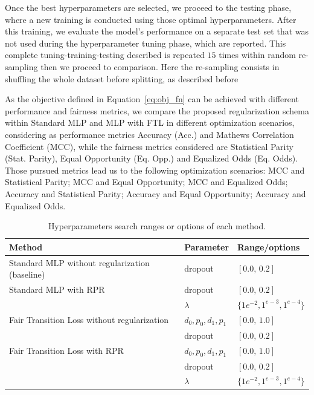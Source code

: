 Once the best hyperparameters are selected, we proceed to the testing phase, where a new training is conducted using those optimal hyperparameters. After this training, we evaluate the model's performance on a separate test set that was not used during the hyperparameter tuning phase, which are reported. This complete tuning-training-testing described is repeated $15$ times within random re-sampling then we proceed to comparison. Here the re-sampling consists in shuffling the whole dataset before splitting, as described before

As the objective defined in Equation~\ref{eq:obj_fn} can be achieved with different performance and fairness metrics, we compare the proposed regularization schema within Standard MLP and MLP with FTL in different optimization scenarios, considering as performance metrics Accuracy (Acc.) and Mathews Correlation Coefficient (MCC), while the fairness metrics considered are Statistical Parity (Stat. Parity), Equal Opportunity (Eq. Opp.) and Equalized Odds (Eq. Odds). Those pursued metrics lead us to the following optimization scenarios: MCC and Statistical Parity; MCC and Equal Opportunity; MCC and Equalized Odds; Accuracy and Statistical Parity; Accuracy and Equal Opportunity; Accuracy and Equalized Odds.

\begin{table}[ht]
\centering
\caption{Hyperparameters search ranges or options of each method.}\label{tab:hyperparameters_rpr}
{\footnotesize
\begin{tabular}{lll}
\toprule
Method & Parameter & Range/options \\ \midrule
 Standard MLP without regularization (baseline) & dropout & $[0.0,\,0.2]$  \vspace{1ex} \\
 Standard MLP with RPR & dropout & $[0.0,\,0.2]$  \vspace{1ex} \\
 & $\lambda$ & $\{1e^{-2}, 1^{e-3}, 1^{e-4}\}$ \\
 Fair Transition Loss without regularization & $d_0,p_0,d_1,p_1$ & $[0.0,\,1.0]$ \\
 &  dropout & $[0.0,\,0.2]$ \\
 Fair Transition Loss with RPR & $d_0,p_0,d_1,p_1$ & $[0.0,\,1.0]$ \\
 &  dropout & $[0.0,\,0.2]$ \\
 & $\lambda$ & $\{1e^{-2}, 1^{e-3}, 1^{e-4}\}$ \\
\bottomrule
\end{tabular}
}
\end{table}


